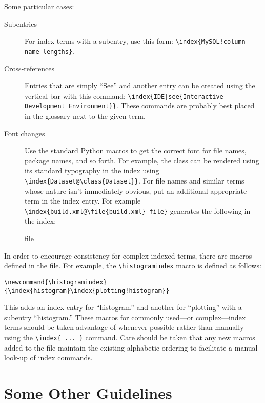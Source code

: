 Some particular cases:

\begin{description}

\item[Subentries] For index terms with a subentry, use this form:
  \verb|\index{MySQL!column name lengths}|.

\item[Cross-references] Entries that are simply ``See'' and another entry
  can be created using the vertical bar with this command:
  \verb+\index{IDE|see{Interactive Development Environment}}+.  These
  commands are probably best placed in the glossary next to the given term.

\item[Font changes] Use the standard Python macros to get the correct font
  for file names, package names, and so forth.  For example, the class
   can be rendered using its standard typography in the
  index using \verb|\index{Dataset@\class{Dataset}}|.  For file names and
  similar terms whose nature isn't immediately obvious, put an additional
  appropriate term in the index entry.  For example
  \verb|\index{build.xml@\file{build.xml} file}| generates the following in
  the index:

   file

\end{description}

In order to encourage consistency for complex indexed terms, there are
macros defined in the  file.  For example, the 
\verb|\histogramindex| macro is defined as follows:

\begin{verbatim}
\newcommand{\histogramindex}  {\index{histogram}\index{plotting!histogram}}
\end{verbatim}

This adds an index entry for ``histogram'' and another for ``plotting''
with a subentry ``histogram.''  These macros for commonly used---or
complex---index terms should be taken advantage of whenever possible rather
than manually using the \verb|\index{ ... }| command.  Care should be taken
that any new macros added to the file maintain the existing alphabetic
ordering to facilitate a manual look-up of index commands.

\section{Some Other Guidelines}

